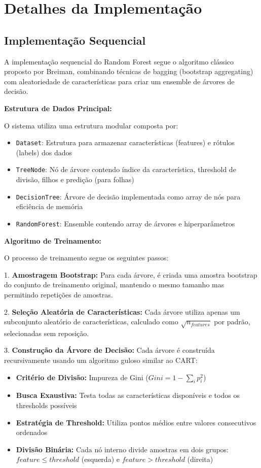 \documentclass[a4paper,11pt]{article}
\begin{document}
\section{Detalhes da Implementação}

\subsection{Implementação Sequencial}

A implementação sequencial do Random Forest segue o algoritmo clássico proposto por Breiman, combinando técnicas de bagging (bootstrap aggregating) com aleatoriedade de características para criar um ensemble de árvores de decisão.

\textbf{Estrutura de Dados Principal:}

O sistema utiliza uma estrutura modular composta por:
\begin{itemize}
    \item \texttt{Dataset}: Estrutura para armazenar características (features) e rótulos (labels) dos dados
    \item \texttt{TreeNode}: Nó de árvore contendo índice da característica, threshold de divisão, filhos e predição (para folhas)
    \item \texttt{DecisionTree}: Árvore de decisão implementada como array de nós para eficiência de memória
    \item \texttt{RandomForest}: Ensemble contendo array de árvores e hiperparâmetros
\end{itemize}

\textbf{Algoritmo de Treinamento:}

O processo de treinamento segue os seguintes passos:

1. \textbf{Amostragem Bootstrap:} Para cada árvore, é criada uma amostra bootstrap do conjunto de treinamento original, mantendo o mesmo tamanho mas permitindo repetições de amostras.

2. \textbf{Seleção Aleatória de Características:} Cada árvore utiliza apenas um subconjunto aleatório de características, calculado como $\sqrt{n_{features}}$ por padrão, selecionadas sem reposição.

3. \textbf{Construção da Árvore de Decisão:} Cada árvore é construída recursivamente usando um algoritmo guloso similar ao CART:
   \begin{itemize}
       \item \textbf{Critério de Divisão:} Impureza de Gini ($Gini = 1 - \sum_{i} p_i^2$)
       \item \textbf{Busca Exaustiva:} Testa todas as características disponíveis e todos os thresholds possíveis
       \item \textbf{Estratégia de Threshold:} Utiliza pontos médios entre valores consecutivos ordenados
       \item \textbf{Divisão Binária:} Cada nó interno divide amostras em dois grupos: $feature \leq threshold$ (esquerda) e $feature > threshold$ (direita)
   \end{itemize}
\end{document}
